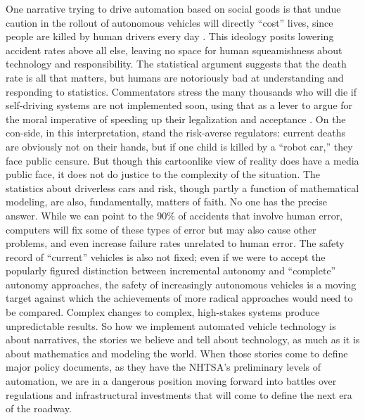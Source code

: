 One narrative trying to drive automation based on social goods is that undue caution in the
rollout of autonomous vehicles will directly ``cost'' lives, since
people are killed by human drivers every day \cite{driverlessfuture}.
This ideology posits lowering accident rates above all else, leaving
no space for human squeamishness about technology and responsibility. 
The statistical argument suggests that the death rate is all that
matters, but humans are notoriously bad at understanding and
responding to statistics. Commentators stress the many
thousands who will die if self-driving systems are not implemented
soon, using that as a lever to argue for the moral imperative of
speeding up their legalization and acceptance \cite{baileyReason}
\cite{howardRobots}. On the con-side, in 
this interpretation, stand the risk-averse regulators: current deaths
are obviously not on their hands, but if one child is killed by a
``robot car,'' they face public censure. But though this cartoonlike
view of reality does have a media public face, it does not do justice
to the complexity of the situation. The statistics about driverless
cars and risk, though partly a function of mathematical modeling, are
also, fundamentally, matters of faith. No one has the precise answer.
While we can point to the 90\% of accidents that involve human error,
computers will fix some of these types of error but may also cause
other problems, and even increase failure rates unrelated to human error.
The safety record of ``current'' vehicles is also not fixed; even if
we were to accept the popularly figured distinction between
incremental autonomy and ``complete'' autonomy approaches, the safety
of increasingly autonomous vehicles is a moving target against which
the achievements of more radical approaches would need to be compared.
Complex changes to complex, high-stakes systems produce unpredictable
results. So how we implement automated vehicle technology is
about narratives, the stories we believe and tell about technology, as
much as it is about mathematics and modeling the world. When those
stories come to define major policy documents, as they have the
NHTSA's preliminary levels of automation, we are in a dangerous
position moving forward into battles over regulations and
infrastructural investments that will come to define the next era of
the roadway.


